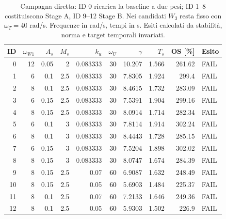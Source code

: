 \begin{table}[htbp]\centering\scriptsize
\begin{tabular}{rrrrrrrrrl}\toprule
ID & $\omega_{W1}$ & $A_s$ & $M_s$ & $k_u$ & $\omega_U$ & $\gamma$ & $T_s$ & OS [\%] & Esito \\\midrule
0 & 12 & 0.05 & 2 & 0.083333 & 30 & 10.207 & 1.566 & 261.62 & FAIL \\
1 & 6 & 0.1 & 2.5 & 0.083333 & 30 & 7.8305 & 1.924 & 299.4 & FAIL \\
2 & 8 & 0.1 & 2.5 & 0.083333 & 30 & 8.4615 & 1.732 & 283.09 & FAIL \\
3 & 6 & 0.15 & 2.5 & 0.083333 & 30 & 7.5391 & 1.904 & 299.16 & FAIL \\
4 & 8 & 0.15 & 2.5 & 0.083333 & 30 & 8.0914 & 1.714 & 282.34 & FAIL \\
5 & 6 & 0.1 & 3 & 0.083333 & 30 & 7.8114 & 1.914 & 302.24 & FAIL \\
6 & 8 & 0.1 & 3 & 0.083333 & 30 & 8.4443 & 1.728 & 285.15 & FAIL \\
7 & 6 & 0.15 & 3 & 0.083333 & 30 & 7.5204 & 1.898 & 302.02 & FAIL \\
8 & 8 & 0.15 & 3 & 0.083333 & 30 & 8.0747 & 1.674 & 284.39 & FAIL \\
9 & 8 & 0.15 & 2.5 & 0.07 & 60 & 6.9087 & 1.632 & 248.49 & FAIL \\
10 & 8 & 0.15 & 2.5 & 0.05 & 60 & 5.6903 & 1.484 & 225.37 & FAIL \\
11 & 8 & 0.1 & 2.5 & 0.07 & 60 & 7.2133 & 1.646 & 249.36 & FAIL \\
12 & 8 & 0.1 & 2.5 & 0.05 & 60 & 5.9303 & 1.502 & 226.9 & FAIL \\
\bottomrule\end{tabular}
\caption{Campagna diretta: ID 0 ricarica la baseline a due pesi; ID 1--8 costituiscono Stage A, ID 9--12 Stage B. Nei candidati $W_3$ resta fisso con $\omega_T=40$ rad/s. Frequenze in rad/s, tempi in s. Esiti calcolati da stabilità, norma e target temporali invariati.}
\label{tab:hinf-campagna}\end{table}
